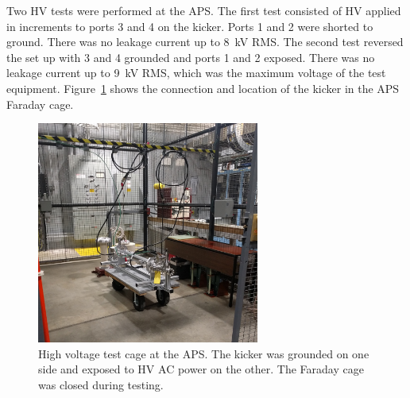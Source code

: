 Two HV tests were performed at the APS. 
The first test consisted of HV applied in increments to ports 3 and 4 on the kicker.  
Ports 1 and 2 were shorted to ground. There was no leakage current up to \SI{8}{kV} RMS.
The second test reversed the set up with 3 and 4 grounded and ports 1 and 2 exposed. 
There was no leakage current up to \SI{9}{kV} RMS, which was the maximum voltage of the test equipment.
Figure~\ref{fig:AWAHVkicker} shows the connection and location of the kicker in the APS Faraday cage.
\begin{figure}%
	\begin{center}
		\includegraphics[width=0.65\textwidth]{./images/kicker1}
		\caption{High voltage test cage at the APS. 
			The kicker was grounded on one side and exposed to HV AC power on the other. 
			The Faraday cage was closed during testing. }
		\label{fig:AWAHVkicker}
	\end{center}
\end{figure}


